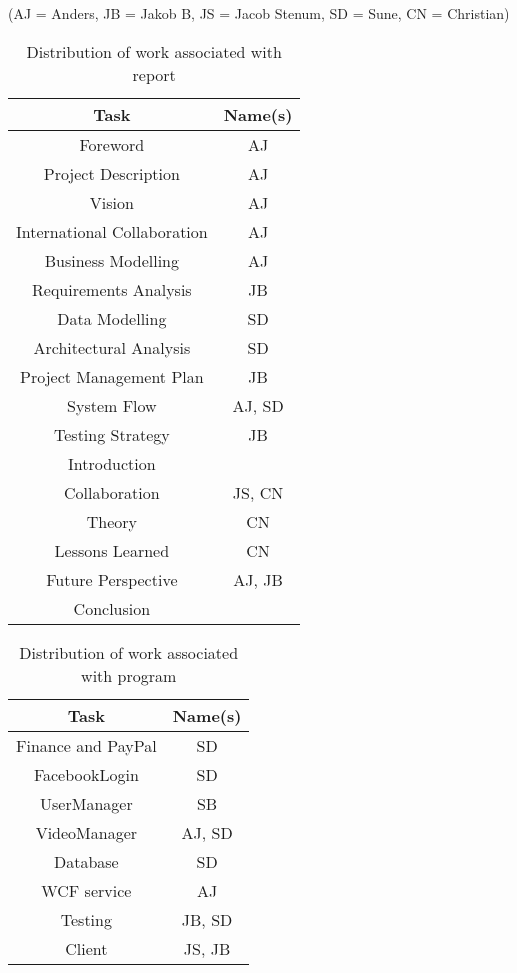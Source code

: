 \label{Distribution of Work}
(AJ = Anders, JB = Jakob B, JS = Jacob Stenum, SD = Sune, CN = Christian)\\
\begin{table}[H]
\caption{Distribution of work associated with report}
\centering

\begin{tabular}{c c}
Task & Name(s) \\ [1.5ex] 
\hline
Foreword & AJ \\
Project Description & AJ \\
Vision & AJ\\
International Collaboration &  AJ \\
Business Modelling & AJ \\
Requirements Analysis & JB\\
Data Modelling & SD \\
Architectural Analysis & SD \\
Project Management Plan & JB \\
System Flow & AJ, SD\\
Testing Strategy & JB\\
Introduction & \\
Collaboration & JS, CN \\
Theory & CN \\
Lessons Learned & CN\\
Future Perspective & AJ, JB \\
Conclusion & \\

\end{tabular}
\end{table}
\newpage
\begin{table}[H]
\caption{Distribution of work associated with program}
\centering
\begin{tabular}{c c}
Task & Name(s)\\ [1.5ex] 
\hline
Finance and PayPal & SD \\
FacebookLogin & SD \\
UserManager & SB \\
VideoManager & AJ, SD \\
Database & SD \\
WCF service & AJ\\
Testing & JB, SD \\
Client & JS, JB\\


\end{tabular}
\end{table}

